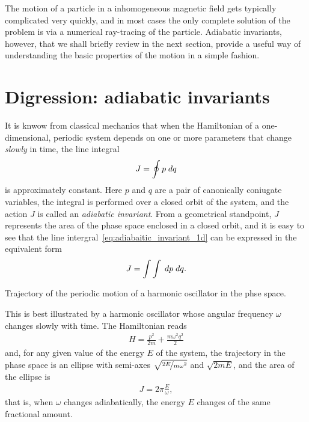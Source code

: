 The motion of a particle in a inhomogeneous magnetic field gets typically complicated
very quickly, and in most cases the only complete solution of the problem is via
a numerical ray-tracing of the particle. Adiabatic invariants, however, that we shall
briefly review in the next section, provide a useful way of understanding the basic
properties of the motion in a simple fashion.


\section{Digression: adiabatic invariants}

It is knwow from classical mechanics that when the Hamiltonian of a one-dimensional,
periodic system depends on one or more parameters that change
\emph{slowly} in time, the line
integral
\begin{align}\label{eq:adiabaitic_invariant_1d}
  J = \oint p \;d{q}
\end{align}
is approximately constant. Here $p$ and $q$ are a pair of canonically coniugate
variables, the integral is performed over a closed orbit of the system, and
the action $J$ is called an \emph{adiabatic invariant}. From a geometrical standpoint,
$J$ represents the area of the phase space enclosed in a closed orbit, and it is
easy to see that the line intergral~\eqref{eq:adiabaitic_invariant_1d} can be
expressed in the equivalent form
\begin{align*}
  J = \int\int \;d{p} \;d{q}.
\end{align*}

\begin{marginfigure}
  
  \caption{Trajectory of the periodic motion of a harmonic oscillator in the phse
  space.}
  \label{fig:adiabatic_invariant}
\end{marginfigure}

This is best illustrated by a harmonic oscillator whose angular frequency $\omega$
changes slowly with time. The Hamiltonian reads
\begin{align*}
  H = \frac{p^2}{2m} + \frac{m\omega^2 q^2}{2}
\end{align*}
and, for any given value of the energy $E$ of the system, the trajectory in the
phase space is an ellipse with semi-axes $\sqrt{\nicefrac{2E}{m\omega^2}}$ and
$\sqrt{2mE}$, and the area of the ellipse is
\begin{align*}
  J = 2\pi \frac{E}{\omega},
\end{align*}
that is, when $\omega$ changes adiabatically, the energy $E$ changes of the same
fractional amount.

